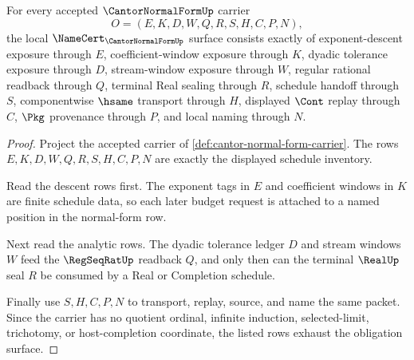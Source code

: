\begin{theorem}
\label{thm:cantor-normal-form-obligation-surface}
For every accepted $\CantorNormalFormUp$ carrier
$$
O=(E,K,D,W,Q,R,S,H,C,P,N),
$$
the local $\NameCert_{\CantorNormalFormUp}$ surface consists exactly of exponent-descent exposure through $E$, coefficient-window exposure through $K$, dyadic tolerance exposure through $D$, stream-window exposure through $W$, regular rational readback through $Q$, terminal Real sealing through $R$, schedule handoff through $S$, componentwise $\hsame$ transport through $H$, displayed $\Cont$ replay through $C$, $\Pkg$ provenance through $P$, and local naming through $N$.
\end{theorem}
\begin{proof}
Project the accepted carrier of \autoref{def:cantor-normal-form-carrier}. The rows $E,K,D,W,Q,R,S,H,C,P,N$ are exactly the displayed schedule inventory.

Read the descent rows first. The exponent tags in $E$ and coefficient windows in $K$ are finite schedule data, so each later budget request is attached to a named position in the normal-form row.

Next read the analytic rows. The dyadic tolerance ledger $D$ and stream windows $W$ feed the $\RegSeqRatUp$ readback $Q$, and only then can the terminal $\RealUp$ seal $R$ be consumed by a Real or Completion schedule.

Finally use $S,H,C,P,N$ to transport, replay, source, and name the same packet. Since the carrier has no quotient ordinal, infinite induction, selected-limit, trichotomy, or host-completion coordinate, the listed rows exhaust the obligation surface.
\end{proof}

